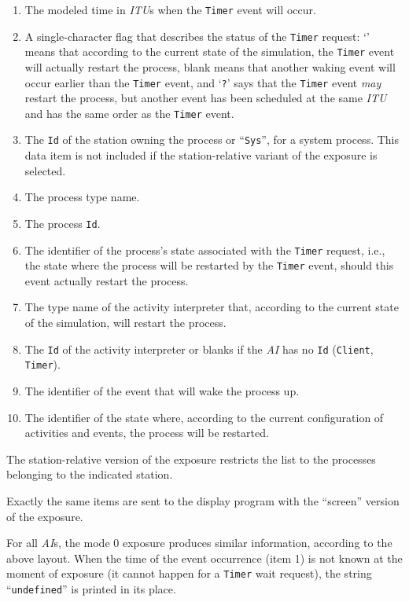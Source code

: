 \begin{enumerate}
\item
The modeled time in {\em ITU\/}s when the {\tt Timer} event will occur.
\item
A single-character flag that describes the status of the {\tt Timer} request:
`{\tt *}' means that according to the current state of the simulation,
the {\tt Timer} event will actually restart the process,
blank means that another
waking event will occur earlier than the {\tt Timer} event,
and `{\tt ?}' says that
the {\tt Timer} event {\em may\/} restart the process,
but another event has been
scheduled at the same {\em ITU\/} and has the same order
as the {\tt Timer} event.
\item
The {\tt Id} of the station owning the process or ``{\tt Sys}'', for a
system process.
This data item is not included if the station-relative variant of the
exposure is selected.
\item
The process type name.
\item
The process {\tt Id}.
\item
The identifier of the process's state associated with the
{\tt Timer} request, i.e.,
the state where the process will be restarted by the {\tt Timer} event,
should this event actually restart the process.
\item
The type name of the activity interpreter that, according to the current
state of the simulation, will restart the process.
\item
The {\tt Id} of the activity interpreter or blanks if the {\em AI\/} has no
{\tt Id} ({\tt Client}, {\tt Timer}).
\item
The identifier of the event that will wake the process up.
\item
The identifier of the state where, according to the current configuration of
activities and events,
the process will be restarted.
\end{enumerate}

The station-relative version of the exposure restricts the list to the processes
belonging to the indicated station.

Exactly the same items are sent to the display program with the ``screen''
version of the exposure.

For all {\em AI\/}s, the mode 0 exposure
produces similar information, according to the above layout.
When the time of the event occurrence (item 1)
is not known at the moment of exposure (it cannot happen for a
{\tt Timer} wait request), the string ``{\tt undefined}'' is
printed in its place.

